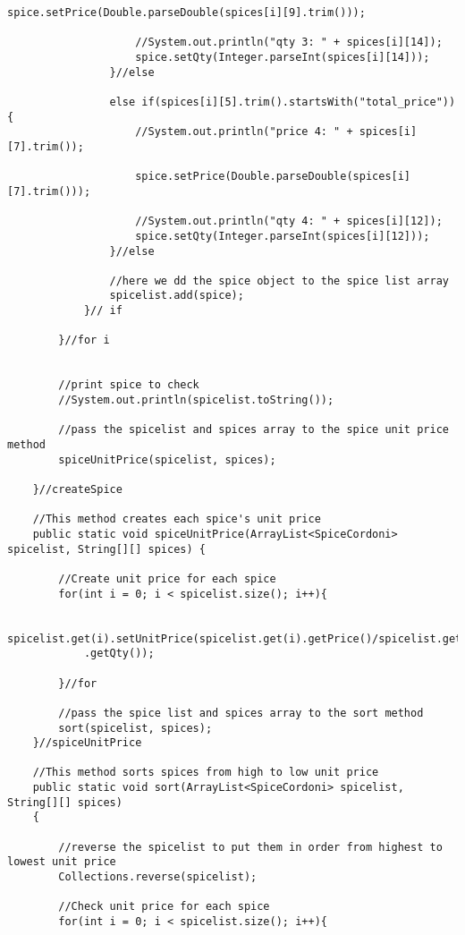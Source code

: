 \documentclass[letterpaper, 10pt,DIV=13]{scrartcl}
\numberwithin{equation}{section} %
\numberwithin{figure}{section} %
\numberwithin{table}{section} %
\begin{document}
\begin{lstlisting}[frame=single, ]
                    spice.setPrice(Double.parseDouble(spices[i][9].trim()));

                    //System.out.println("qty 3: " + spices[i][14]);
                    spice.setQty(Integer.parseInt(spices[i][14]));
                }//else

                else if(spices[i][5].trim().startsWith("total_price")){
                    //System.out.println("price 4: " + spices[i][7].trim());

                    spice.setPrice(Double.parseDouble(spices[i][7].trim()));

                    //System.out.println("qty 4: " + spices[i][12]);
                    spice.setQty(Integer.parseInt(spices[i][12]));
                }//else
 
                //here we dd the spice object to the spice list array
                spicelist.add(spice);
            }// if  
            
        }//for i
         
        
        //print spice to check
        //System.out.println(spicelist.toString());

        //pass the spicelist and spices array to the spice unit price method
        spiceUnitPrice(spicelist, spices);

    }//createSpice

    //This method creates each spice's unit price
    public static void spiceUnitPrice(ArrayList<SpiceCordoni> spicelist, String[][] spices) {
 
        //Create unit price for each spice
        for(int i = 0; i < spicelist.size(); i++){

            spicelist.get(i).setUnitPrice(spicelist.get(i).getPrice()/spicelist.get(i)
            .getQty());

        }//for

        //pass the spice list and spices array to the sort method
        sort(spicelist, spices);
    }//spiceUnitPrice

    //This method sorts spices from high to low unit price
    public static void sort(ArrayList<SpiceCordoni> spicelist, String[][] spices)
    {

        //reverse the spicelist to put them in order from highest to lowest unit price
        Collections.reverse(spicelist);

        //Check unit price for each spice
        for(int i = 0; i < spicelist.size(); i++){


\end{lstlisting}
\end{document}
